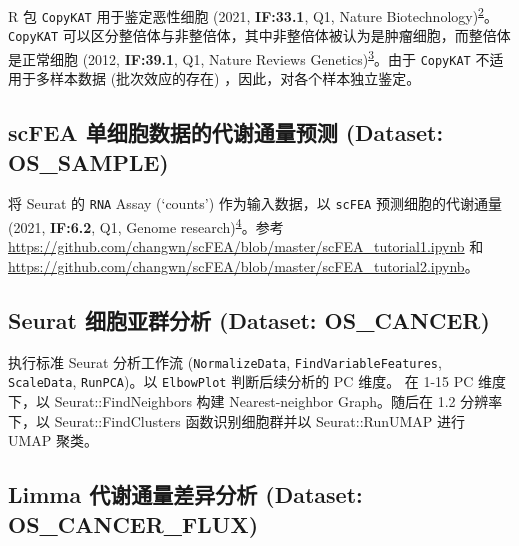 \documentclass[
]{article}
\begin{document}
R 包 \texttt{CopyKAT} 用于鉴定恶性细胞 (2021, \textbf{IF:33.1}, Q1, Nature Biotechnology)\textsuperscript{\protect\hyperlink{ref-DelineatingCopGaoR2021}{2}}。\texttt{CopyKAT} 可以区分整倍体与非整倍体，其中非整倍体被认为是肿瘤细胞，而整倍体是正常细胞 (2012, \textbf{IF:39.1}, Q1, Nature Reviews Genetics)\textsuperscript{\protect\hyperlink{ref-CausesAndConsGordon2012}{3}}。由于 \texttt{CopyKAT} 不适用于多样本数据 (批次效应的存在) ，因此，对各个样本独立鉴定。

\hypertarget{scfea-ux5355ux7ec6ux80deux6570ux636eux7684ux4ee3ux8c22ux901aux91cfux9884ux6d4b-dataset-os_sample}{%
\subsection{scFEA 单细胞数据的代谢通量预测 (Dataset: OS\_SAMPLE)}\label{scfea-ux5355ux7ec6ux80deux6570ux636eux7684ux4ee3ux8c22ux901aux91cfux9884ux6d4b-dataset-os_sample}}

将 Seurat 的 \texttt{RNA} Assay (`counts') 作为输入数据，以 \texttt{scFEA} 预测细胞的代谢通量 (2021, \textbf{IF:6.2}, Q1, Genome research)\textsuperscript{\protect\hyperlink{ref-AGraphNeuralAlgham2021}{4}}。参考 \url{https://github.com/changwn/scFEA/blob/master/scFEA_tutorial1.ipynb} 和 \url{https://github.com/changwn/scFEA/blob/master/scFEA_tutorial2.ipynb}。

\hypertarget{seurat-ux7ec6ux80deux4e9aux7fa4ux5206ux6790-dataset-os_cancer}{%
\subsection{Seurat 细胞亚群分析 (Dataset: OS\_CANCER)}\label{seurat-ux7ec6ux80deux4e9aux7fa4ux5206ux6790-dataset-os_cancer}}

执行标准 Seurat 分析工作流 (\texttt{NormalizeData}, \texttt{FindVariableFeatures}, \texttt{ScaleData}, \texttt{RunPCA})。以 \texttt{ElbowPlot} 判断后续分析的 PC 维度。
在 1-15 PC 维度下，以 Seurat::FindNeighbors 构建 Nearest-neighbor Graph。随后在 1.2 分辨率下，以 Seurat::FindClusters 函数识别细胞群并以 Seurat::RunUMAP 进行 UMAP 聚类。

\hypertarget{limma-ux4ee3ux8c22ux901aux91cfux5deeux5f02ux5206ux6790-dataset-os_cancer_flux}{%
\subsection{Limma 代谢通量差异分析 (Dataset: OS\_CANCER\_FLUX)}\label{limma-ux4ee3ux8c22ux901aux91cfux5deeux5f02ux5206ux6790-dataset-os_cancer_flux}}
\end{document}
